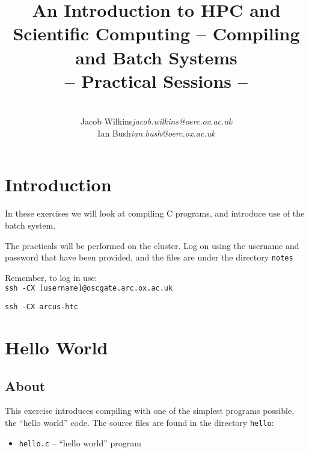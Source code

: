 \documentclass[a4paper, 12pt]{article}
\title{{\Huge\bf An Introduction to HPC and Scientific Computing -- Compiling and Batch Systems} \\ {\huge -- Practical Sessions --}}
\date{}
\author{\bf
  \begin{tabular}{ll}
    Jacob Wilkins & {\em jacob.wilkins@oerc.ox.ac.uk} \\
    Ian Bush   & {\em ian.bush@oerc.ox.ac.uk}
  \end{tabular}
}
\def \cc   {\tt }               %
\begin{document}
\maketitle

\vfill

\tableofcontents

\newpage


\section{Introduction}
\label{Introduction}

In these exercises we will look at compiling C programs, and introduce use of the batch system.

The practicals will be performed on the cluster. Log on using the username and password that have been provided, and the files are under the directory {\cc notes}

Remember, to log in use: \\
{\cc ssh -CX [username]@oscgate.arc.ox.ac.uk}

{\cc ssh -CX arcus-htc}


\section{Hello World}
\label{basics}

\subsection*{About}

This exercise introduces compiling with
one of the simplest programs possible, the ``hello world'' code.  The source
files are found in the directory {\cc hello}:
%
\begin{itemize}
  \item {\cc hello.c} -- ``hello world'' program 
\end{itemize}
%
\end{document}
